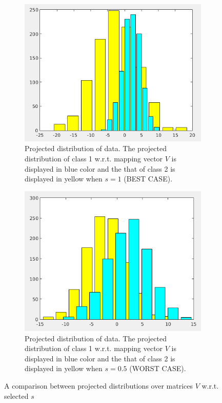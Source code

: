 \documentclass[12pt]{article}
\begin{document}
\begin{enumerate}
\begin{figure}[h]
\centering
\begin{subfigure}{0.4\textwidth}
\includegraphics[scale=0.3]{Imgs/2_2_2.png}
\caption{Projected distribution of data. The projected distribution of class 1 w.r.t. mapping vector $V$ is displayed in blue color and the that of class 2 is displayed in yellow when $s = 1$ (BEST CASE).}
\end{subfigure}
\begin{subfigure}{0.4\textwidth}
\includegraphics[scale=0.3]{Imgs/2_2_3.png}
\caption{Projected distribution of data. The projected distribution of class 1 w.r.t. mapping vector $V$ is displayed in blue color and the that of class 2 is displayed in yellow when $s = 0.5$ (WORST CASE).}
\end{subfigure}
\caption{A comparison between projected distributions over matrices $V$ w.r.t. selected $s$}
\label{fig:3}
\end{figure}



\end{enumerate}
\end{document}
